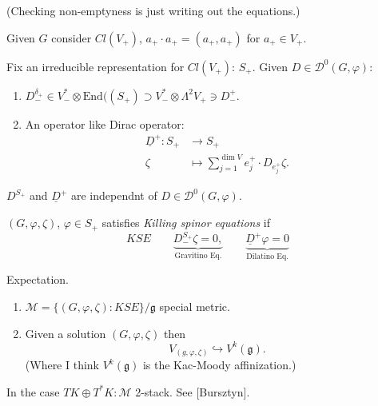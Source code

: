 (Checking non-emptyness is just writing out
the equations.)

\medskip\noindent
Given $G$ consider $Cl (V_+)$,
 $a_+\cdot a_+=(a_+,a_+)$ for $a_+ \in V_+$.

Fix an irreducible representation for
$Cl(V_+)$: $S_+$.
Given  $D \in \mathcal{D}^0(G,\varphi)$:
\begin{enumerate}
\item $D_-^{\delta_+} \in V_-^* \otimes
\text{End}((S_+)\supset
V_-^*\otimes \Lambda^{2}V_+ \ni D_-^+$.
\item An operator like Dirac operator:
$$
\begin{aligned}
\underline{D}^+: S_+ &\longrightarrow S_+ \\
\zeta &\longmapsto \sum_{j=1}^{\dim
V}e_j^+\cdot D_{e_j^+}\zeta.
\end{aligned}
$$
\end{enumerate}

\begin{lemma}
\label{lemma-independendant}
$D^{S_+}$ and $\underline{D}^+$ are
independnt of
$D \in \mathcal{D}^0(G,\varphi)$.
\end{lemma}

\begin{definition}
\label{definition-Killing-spinor-equations}
$(G,\varphi,\zeta)$, $\varphi \in S_+$
satisfies
{\it Killing spinor equations} if
$$
KSE\qquad
\underbrace{D_-^{S_+}\zeta=0,}
_{\text{Gravitino
Eq.}}\qquad
\underbrace{\underline{D}^+\varphi=0
}_{\text{Dilatino Eq.}}$$
\end{definition}

Expectation.
\begin{enumerate}
\item
$\mathcal{M}=\{(G,\varphi,\zeta):KSE\}/
\mathfrak{g}$
special metric.
\item Given a solution $(G,\varphi,\zeta)$
then
$$
V_{(g,\varphi,\zeta)}\hookrightarrow
V^k(\mathfrak{g}).
$$
(Where I think $V^k(\mathfrak{g})$ is the
Kac-Moody affinization.)
\end{enumerate}

\begin{remark}
\label{remark-Lie-algebra}
In the case $T K \oplus T^*K: \mathcal{M}$
2-stack. See [Bursztyn].
\end{remark}

